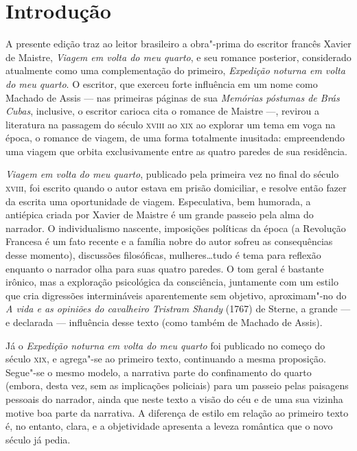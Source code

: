 \chapter[Introdução \medskip]{Introdução}


A presente edição traz ao leitor brasileiro a obra"-prima do escritor francês Xavier de Maistre, \textit{Viagem em volta do meu quarto}, e seu romance posterior, considerado atualmente como uma complementação do primeiro, \textit{Expedição noturna em volta do meu quarto}.
O escritor, que exerceu forte influência em um nome como Machado de Assis --- nas primeiras páginas de sua \textit{Memórias póstumas de Brás Cubas}, inclusive, o escritor carioca cita o romance de Maistre ---, revirou a literatura na passagem do século \textsc{xviii} ao \textsc{xix} ao explorar um tema em voga na época, o romance de viagem, de uma forma totalmente inusitada: empreendendo uma viagem que orbita exclusivamente entre as quatro paredes de sua residência.

\textit{Viagem em volta do meu quarto}, publicado pela primeira vez
no final do século \textsc{xviii}, foi escrito quando o autor estava em prisão domiciliar, e resolve então fazer da escrita uma oportunidade de viagem. Especulativa, bem
humorada, a antiépica criada por Xavier de Maistre é um grande passeio
pela alma do narrador. O individualismo nascente, imposições políticas
da época (a Revolução Francesa é um fato recente e a família nobre do
autor sofreu as consequências desse momento), discussões filosóficas,
mulheres\ldots tudo é tema para reflexão enquanto o narrador olha para
suas quatro paredes. O tom geral é bastante irônico, mas a exploração
psicológica da consciência, juntamente com um estilo que cria
digressões intermináveis aparentemente sem objetivo, aproximam"-no do
\textit{A vida e as opiniões do cavalheiro Tristram Shandy} (1767) de
Sterne, a grande --- e declarada --- influência desse texto (como também de Machado de Assis).  

Já o \textit{Expedição noturna em volta do meu quarto} foi publicado no
começo do século \textsc{xix}, e agrega"-se ao primeiro texto, continuando a
mesma proposição. Segue"-se o mesmo modelo, a narrativa parte do
confinamento do quarto (embora, desta vez, sem as implicações
policiais) para um passeio pelas paisagens pessoais do narrador, ainda
que neste texto a visão do céu e de uma sua vizinha motive boa parte
da narrativa. A diferença de estilo em relação ao primeiro texto é, no
entanto, clara, e a objetividade apresenta a leveza romântica que o
novo século já pedia.

